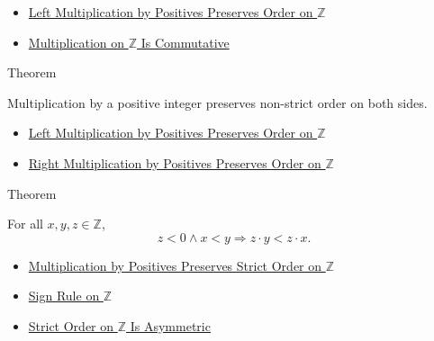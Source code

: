 \begin{dependencies}
\begin{itemize}
  \item \hyperref[thm:left-positive-multiplication-preserves-order-on-z]{Left Multiplication by Positives Preserves Order on $\mathbb{Z}$}
  \item \hyperref[thm:multiplication-on-z-commutative]{Multiplication on $\mathbb{Z}$ Is Commutative}
\end{itemize}
\end{dependencies}

\begin{theorembox}{Theorem}
\begin{theorem}
\label{thm:positive-multiplication-preserves-order-on-z}
Multiplication by a positive integer preserves non-strict order on both sides.
\end{theorem}
\end{theorembox}

\begin{dependencies}
\begin{itemize}
  \item \hyperref[thm:left-positive-multiplication-preserves-order-on-z]{Left Multiplication by Positives Preserves Order on $\mathbb{Z}$}
  \item \hyperref[cor:right-positive-multiplication-preserves-order-on-z]{Right Multiplication by Positives Preserves Order on $\mathbb{Z}$}
\end{itemize}
\end{dependencies}

\begin{theorembox}{Theorem}
\begin{theorem}
\label{thm:negative-multiplication-reverses-strict-order-on-z}
For all $x,y,z\in\mathbb{Z}$,
\[
z<0\land x<y \Longrightarrow z\cdot y<z\cdot x.
\]
\end{theorem}
\end{theorembox}

\begin{dependencies}
\begin{itemize}
  \item \hyperref[thm:positive-multiplication-preserves-strict-order-on-z]{Multiplication by Positives Preserves Strict Order on $\mathbb{Z}$}
  \item \hyperref[cor:sign-rule-on-z]{Sign Rule on $\mathbb{Z}$}
  \item \hyperref[thm:strict-order-on-z-asymmetric]{Strict Order on $\mathbb{Z}$ Is Asymmetric}
\end{itemize}
\end{dependencies}

